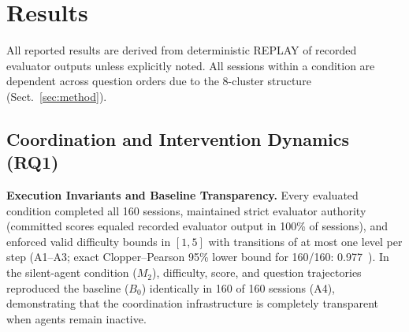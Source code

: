 \section{Results}\label{sec:results}
All reported results are derived from deterministic REPLAY of recorded evaluator outputs unless explicitly noted. All sessions within a condition are dependent across question orders due to the 8-cluster structure (Sect.~\ref{sec:method}).

\subsection{Coordination and Intervention Dynamics (RQ1)}

\begin{table}[tbp]
\centering\scriptsize\setlength{\tabcolsep}{3pt}
\caption{Replay ablation summary across 160 sessions per condition (mean per session unless noted as counts). \textbf{compl./auth./trans.}: sessions completing, keeping committed scores authoritative, and preserving valid transitions. \textbf{chg./rev.}: mean level changes and reversals; \textbf{agr.}: fraction of decisions agreeing with the PPO action; \textbf{gfire}: guardrail overrides; \textbf{strat.}: decisions where the Strategy Agent was the final action source; \textbf{byp.}: sessions with guardrail bypass; \textbf{p50/p95}: pooled per-turn latency in ms; \textbf{calls}: agent calls per session.}\label{tab:xa}
\resizebox{\textwidth}{!}{}
\end{table}

\begin{table}[tbp]
\centering\scriptsize\setlength{\tabcolsep}{3pt}
\caption{Paired differences ($M_1 - B_0$) over identical 160 replay sessions: fraction of sessions with divergent difficulty paths, paired mean differences with 95\% percentile-bootstrap intervals, and pooled median turn latency delta. Intervals are descriptive due to cluster reuse.}\label{tab:xapaired}
\resizebox{\textwidth}{!}{}
\end{table}

\noindent\textbf{Execution Invariants and Baseline Transparency.} Every evaluated condition completed all 160 sessions, maintained strict evaluator authority (committed scores equaled recorded evaluator output in 100\% of sessions), and enforced valid difficulty bounds in $[1, 5]$ with transitions of at most one level per step (A1--A3; exact Clopper--Pearson 95\% lower bound for 160/160: 0.977~\cite{cp34}). In the silent-agent condition ($M_2$), difficulty, score, and question trajectories reproduced the baseline ($B_0$) identically in 160 of 160 sessions (A4), demonstrating that the coordination infrastructure is completely transparent when agents remain inactive.


